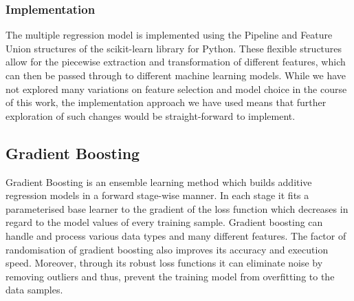\documentclass{article} %
\begin{document}
\subsubsection*{Implementation}
The multiple regression model is implemented using the Pipeline and Feature Union structures of the scikit-learn library for Python.  These flexible structures allow for the piecewise extraction and transformation of different features, which can then be passed through to different machine learning models.  While we have not explored many variations on feature selection and model choice in the course of this work, the implementation approach we have used means that further exploration of such changes would be straight-forward to implement.


\subsection*{Gradient Boosting}
Gradient Boosting is an ensemble learning method which builds additive regression models in a forward stage-wise manner. In each stage it fits a parameterised base learner to the gradient of the loss function which decreases in regard to the model values of every training sample. Gradient boosting can handle and process various data types and many different features. The factor of randomisation of gradient boosting also improves its accuracy and execution speed. Moreover, through its robust loss functions it can eliminate noise by removing outliers and thus, prevent the training model from overfitting to the data samples.
\end{document}
